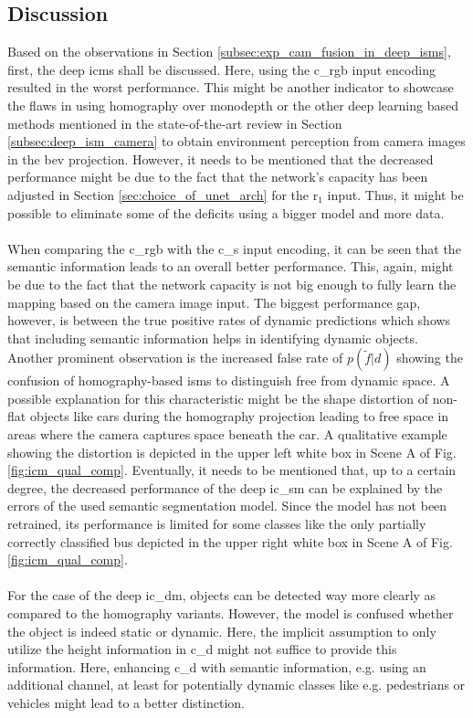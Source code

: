 \subsection{Discussion}
\label{subsec:discussion_deep_icm_ilm}
Based on the observations in Section \ref{subsec:exp_cam_fusion_in_deep_isms}, first, the deep \gls{icm}s shall be discussed. Here, using the \gls{c_rgb} input encoding resulted in the worst performance. This might be another indicator to showcase the flaws in using homography over \gls{monodepth} or the other deep learning based methods mentioned in the state-of-the-art review in Section \ref{subsec:deep_ism_camera} to obtain environment perception from camera images in the \gls{bev} projection. However, it needs to be mentioned that the decreased performance might be due to the fact that the network's capacity has been adjusted in Section \ref{sec:choice_of_unet_arch} for the \gls{r}$_1$ input. Thus, it might be possible to eliminate some of the deficits using a bigger model and more data.
\\\\
When comparing the \gls{c_rgb} with the \gls{c_s} input encoding, it can be seen that the semantic information leads to an overall better performance. This, again, might be due to the fact that the network capacity is not big enough to fully learn the mapping based on the camera image input. The biggest performance gap, however, is between the true positive rates of dynamic predictions which shows that including semantic information helps in identifying dynamic objects. Another prominent observation is the increased false rate of $p(\tilde{f}|d)$ showing the confusion of homography-based \gls{ism}s to distinguish free from dynamic space. A possible explanation for this characteristic might be the shape distortion of non-flat objects like cars during the homography projection leading to free space in areas where the camera captures space beneath the car. A qualitative example showing the distortion is depicted in the upper left white box in Scene A of Fig. \ref{fig:icm_qual_comp}. Eventually, it needs to be mentioned that, up to a certain degree, the decreased performance of the deep \gls{ic_sm} can be explained by the errors of the used semantic segmentation model. Since the model has not been retrained, its performance is limited for some classes like the only partially correctly classified bus depicted in the upper right white box in Scene A of Fig. \ref{fig:icm_qual_comp}.
\\\\
For the case of the deep \gls{ic_dm}, objects can be detected way more clearly as compared to the homography variants. However, the model is confused whether the object is indeed static or dynamic. Here, the implicit assumption to only utilize the height information in \gls{c_d} might not suffice to provide this information. Here, enhancing \gls{c_d} with semantic information, e.g. using an additional channel, at least for potentially dynamic classes like e.g. pedestrians or vehicles might lead to a better distinction.
